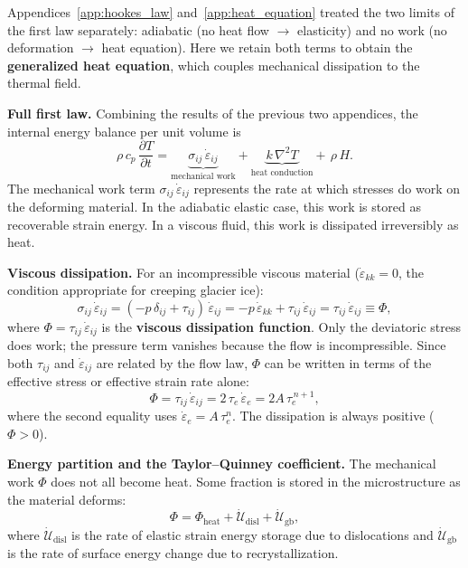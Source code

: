 \documentclass[11pt]{article}
\begin{document}
Appendices~\ref{app:hookes_law} and~\ref{app:heat_equation} treated the two limits of the first law separately: adiabatic (no heat flow $\to$ elasticity) and no work (no deformation $\to$ heat equation).  Here we retain both terms to obtain the \textbf{generalized heat equation}, which couples mechanical dissipation to the thermal field.

\medskip
\noindent\textbf{Full first law.}  Combining the results of the previous two appendices, the internal energy balance per unit volume is
\begin{equation}
  \rho\,c_p\,\frac{\partial T}{\partial t} = \underbrace{\sigma_{ij}\,\dot{\varepsilon}_{ij}}_{\text{mechanical work}} + \underbrace{k\,\nabla^2 T}_{\text{heat conduction}} + \,\rho\,H.
  \label{eq:generalized_heat}
\end{equation}
The mechanical work term $\sigma_{ij}\,\dot{\varepsilon}_{ij}$ represents the rate at which stresses do work on the deforming material.  In the adiabatic elastic case, this work is stored as recoverable strain energy.  In a viscous fluid, this work is dissipated irreversibly as heat.

\medskip
\noindent\textbf{Viscous dissipation.}  For an incompressible viscous material ($\dot{\varepsilon}_{kk} = 0$, the condition appropriate for creeping glacier ice):
\begin{equation}
  \sigma_{ij}\,\dot{\varepsilon}_{ij} = (-p\,\delta_{ij} + \tau_{ij})\,\dot{\varepsilon}_{ij} = -p\,\dot{\varepsilon}_{kk} + \tau_{ij}\,\dot{\varepsilon}_{ij} = \tau_{ij}\,\dot{\varepsilon}_{ij} \equiv \Phi,
  \label{eq:dissipation}
\end{equation}
where $\Phi = \tau_{ij}\,\dot{\varepsilon}_{ij}$ is the \textbf{viscous dissipation function}.  Only the deviatoric stress does work; the pressure term vanishes because the flow is incompressible.  Since both $\tau_{ij}$ and $\dot{\varepsilon}_{ij}$ are related by the flow law, $\Phi$ can be written in terms of the effective stress or effective strain rate alone:
\begin{equation}
  \Phi = \tau_{ij}\,\dot{\varepsilon}_{ij} = 2\,\tau_e\,\dot{\varepsilon}_e = 2A\,\tau_e^{\,n+1},
  \label{eq:dissipation_glen}
\end{equation}
where the second equality uses $\dot{\varepsilon}_e = A\,\tau_e^n$.  The dissipation is always positive ($\Phi > 0$).

\medskip
\noindent\textbf{Energy partition and the Taylor--Quinney coefficient.}  The mechanical work $\Phi$ does not all become heat.  Some fraction is stored in the microstructure as the material deforms:
\begin{equation}
  \Phi = \Phi_{\text{heat}} + \dot{\mathcal{U}}_{\text{disl}} + \dot{\mathcal{U}}_{\text{gb}},
  \label{eq:energy_partition}
\end{equation}
where $\dot{\mathcal{U}}_{\text{disl}}$ is the rate of elastic strain energy storage due to dislocations and $\dot{\mathcal{U}}_{\text{gb}}$ is the rate of surface energy change due to recrystallization.
\end{document}
